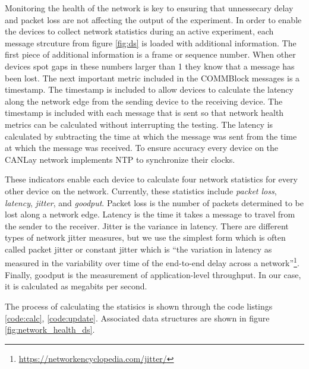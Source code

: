 \documentclass[letterpaper,twocolumn,12pt]{article}
\begin{document}
Monitoring the health of the network is key to ensuring that unnessecary delay and packet loss are not affecting the output of the experiment. In order to enable the devices to collect network statistics during an active experiment, each message strcuture from figure \ref{fig:ds} is loaded with additional information. The first piece of additional information is a frame or sequence number. When other devices spot gaps in these numbers larger than 1 they know that a message has been lost.
The next important metric included in the COMMBlock messages is a timestamp. 
The timestamp is included to allow devices to calculate the latency along the network edge from the sending device to the receiving device.
The timestamp is included with each message that is sent so that network health metrics can be calculated without interrupting the testing. The latency is calculated by subtracting the time at which the message was sent from the time at which the message was received. To ensure accuracy every device on the CANLay network implements NTP to synchronize their clocks.

These indicators enable each device to calculate four network statistics for every other device on the network. Currently, these statistics include \emph{packet loss}, \emph{latency}, \emph{jitter}, and \emph{goodput}. Packet loss is the number of packets determined to be lost along a network edge. Latency is the time it takes a message to travel from the sender to the receiver. Jitter is the variance in latency. There are different types of network jitter measures, but we use the simplest form which is often called packet jitter or constant jitter which is “the variation in latency as measured in the variability over time of the end-to-end delay across a network”\footnote{\url{https://networkencyclopedia.com/jitter/}}. Finally, goodput is the measurement of application-level throughput. In our case, it is calculated as megabits per second.

The process of calculating the statisics is shown through the code listings \ref{code:calc}, \ref{code:update}. Associated data structures are shown in figure \ref{fig:network_health_ds}.

\end{document}
